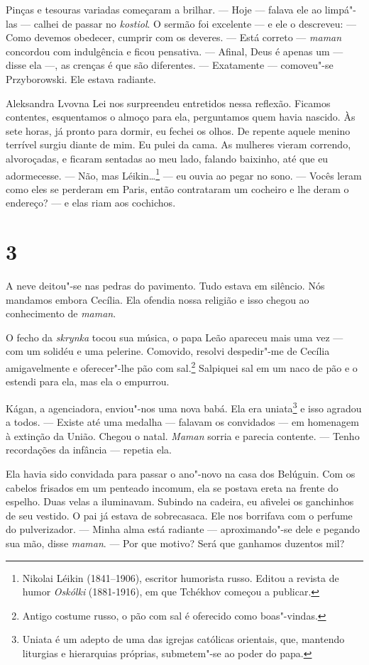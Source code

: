 Pinças e tesouras variadas começaram a brilhar. --- Hoje --- falava ele
ao limpá"-las --- calhei de passar no \emph{kostiol}. O sermão foi
excelente --- e ele o descreveu: --- Como devemos obedecer, cumprir com
os deveres. --- Está correto --- \emph{maman} concordou com indulgência
e ficou pensativa. --- Afinal, Deus é apenas um --- disse ela ---, as
crenças é que são diferentes. --- Exatamente --- comoveu"-se
Przyborowski. Ele estava radiante.

Aleksandra Lvovna Lei nos surpreendeu entretidos nessa reflexão. Ficamos
contentes, esquentamos o almoço para ela, perguntamos quem havia
nascido. Às sete horas, já pronto para dormir, eu fechei os olhos. De
repente aquele menino terrível surgiu diante de mim. Eu pulei da cama.
As mulheres vieram correndo, alvoroçadas, e ficaram sentadas ao meu
lado, falando baixinho, até que eu adormecesse. --- Não, mas
Léikin\ldots{}\footnote{Nikolai Léikin (1841--1906), escritor humorista
  russo. Editou a revista de humor \emph{Oskólki} (1881-1916), em
  que Tchékhov começou a publicar.} --- eu ouvia ao pegar no sono. ---
Vocês leram como eles se perderam em Paris, então contrataram um
cocheiro e lhe deram o endereço? --- e elas riam aos cochichos.

\section{3}

A neve deitou"-se nas pedras do pavimento. Tudo estava em silêncio. Nós
mandamos embora Cecília. Ela ofendia nossa religião e isso chegou ao
conhecimento de \emph{maman}.

O fecho da \emph{skrynka} tocou sua música, o papa Leão apareceu mais
uma vez --- com um solidéu e uma pelerine. Comovido, resolvi despedir"-me
de Cecília amigavelmente e oferecer"-lhe pão com sal.\footnote{Antigo
  costume russo, o pão com sal é oferecido como boas"-vindas.} Salpiquei
sal em um naco de pão e o estendi para ela, mas ela o empurrou.

Kágan, a agenciadora, enviou"-nos uma nova babá. Ela era uniata\footnote{Uniata
  é um adepto de uma das igrejas católicas orientais, que, mantendo
  liturgias e hierarquias próprias, submetem"-se ao poder do papa.} e
isso agradou a todos. --- Existe até uma medalha --- falavam os
convidados --- em homenagem à extinção da União. Chegou o natal.
\emph{Maman} sorria e parecia contente. --- Tenho recordações da
infância --- repetia ela.

Ela havia sido convidada para passar o ano"-novo na casa dos Belúguin.
Com os cabelos frisados em um penteado incomum, ela se postava ereta na
frente do espelho. Duas velas a iluminavam. Subindo na cadeira, eu
afivelei os ganchinhos de seu vestido. O pai já estava de sobrecasaca.
Ele nos borrifava com o perfume do pulverizador. --- Minha alma está
radiante --- aproximando"-se dele e pegando sua mão, disse \emph{maman}.
--- Por que motivo? Será que ganhamos duzentos mil?

